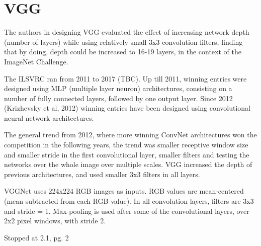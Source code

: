 \documentclass{article}
\begin{document}
\section{VGG}

The authors in designing VGG evaluated the effect of increasing network depth (number of layers) while using relatively small 3x3 convolution filters, finding that by doing, depth could be increased to 16-19 layers, in the context of the ImageNet Challenge.

The ILSVRC ran from 2011 to 2017 (TBC). Up till 2011, winning entries were designed using MLP (multiple layer neuron) architectures, consisting on a number of fully connected layers, followed by one output layer. Since 2012 (Krizhevsky et al, 2012) winning entries have been designed using convolutional neural network architectures.  

The general trend from 2012, where more winning ConvNet architectures won the competition in the following years, the trend was smaller receptive window size and smaller stride in the first convolutional layer, smaller filters and testing the networks over the whole image over multiple scales. VGG increased the depth of previous architectures, and used smaller 3x3 filters in all layers.

VGGNet uses 224x224 RGB images as inputs. RGB values are mean-centered (mean subtracted from each RGB value). In all convolution layers, filters are 3x3 and stride = 1. Max-pooling is used after some of the convolutional layers, over 2x2 pixel windows, with stride 2.  

Stopped at 2.1, pg. 2
\end{document}
